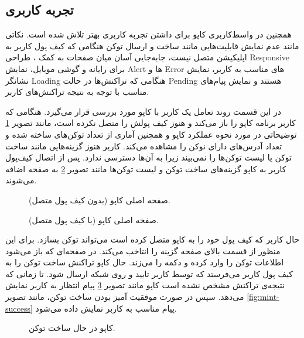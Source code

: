 \subsection{تجربه کاربری}
همچنین در واسط‌کاربری کاپو برای داشتن تجربه کاربری بهتر تلاش شده است.
نکاتی مانند عدم نمایش قابلیت‌هایی مانند ساخت و ارسال توکن هنگامی که کیف پول کاربر به اپلیکیشن متصل نیست،
جابه‌جایی آسان میان صفحات به کمک
، طراحی
\gls{Responsive}
برای رایانه و گوشی موبایل، نمایش
\gls{Alert}
ها و
\gls{Error}
های مناسب به کاربر، نمایش نشانگر
\gls{Loading}
هنگامی که تراکنش‌ها در حالت
\gls{Pending}
هستند و نمایش پیام‌های مناسب با توجه به نتیجه تراکنش‌های کاربر.

در این قسمت روند تعامل یک کاربر با کاپو مورد بررسی قرار می‌گیرد.
هنگامی که کاربر برنامه کاپو را باز می‌کند و هنوز کیف پولش را متصل نکرده است،
مانند تصویر
\ref{fig:homepage-not-loggedin}
توضیحاتی در مورد نحوه عملکرد کاپو
و همچنین آماری از تعداد توکن‌های ساخته شده و تعداد آدرس‌های دارای نوکن را مشاهده می‌کند.
کاربر هنوز گزینه‌هایی مانند ساخت توکن یا لیست توکن‌ها را نمی‌بیند زیرا به آن‌ها دسترسی ندارد.
پس از اتصال کیف‌پول کاربر  به کاپو گزینه‌های ساخت توکن و لیست توکن‌ها مانند تصویر
\ref{fig:homepage-loggedin}
به صفحه اضافه می‌شوند.

\begin{figure}
\centerline{}
\caption{صفحه اصلی کاپو (بدون کیف پول متصل).}
\label{fig:homepage-not-loggedin}
\end{figure}

\begin{figure}
\centerline{}
\caption{صفحه اصلی کاپو (با کیف پول متصل).}
\label{fig:homepage-loggedin}
\end{figure}

حال کاربر که کیف پول خود را به کاپو متصل کرده است می‌تواند توکن بسازد.
برای این منظور از قسمت بالای صفحه گزینه
را انتاخب می‌کند.
در صفحه‌ای که باز می‌شود اطلاعات توکن را وارد کرده و دکمه
را می‌زند.
حال کاپو تراکنش ساخت توکن را به کیف پول کاربر می‌فرستد که توسط کاربر تایید و روی شبکه ارسال شود.
تا زمانی که نتیجه‌ی تراکنش مشخص نشده است کاپو مانند تصویر
\ref{fig:mint-loading}
پیام انتظار به کاربر نمایش می‌دهد.
سپس در صورت موفقیت آمیز بودن ساخت توکن، مانند تصویر
\ref{fig:mint-success}
پیام مناسب به کاربر نمایش داده می‌شود.

\begin{figure}
\centerline{}
\caption{کاپو در حال ساخت توکن.}
\label{fig:mint-loading}
\end{figure}

